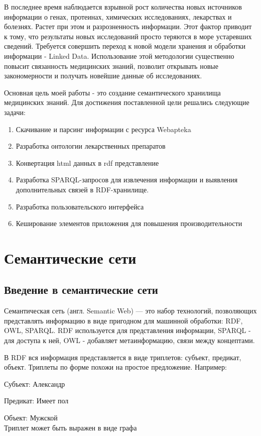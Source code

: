 \documentclass[specialist,subf,href,colorlinks=true
]{disser}
\begin{document}
\tableofcontents %
\intro
В последнее время наблюдается взрывной рост количества новых источников информации о генах, протеинах, химических исследованиях, лекарствах и болезнях. Растет при этом и разрозненность информации. Этот фактор приводит к тому, что результаты новых исследований просто теряются в море устаревших сведений.
Требуется совершить переход к новой модели хранения и обработки информации - Linked Data. Использование этой методологии существенно повысит связанность медицинских знаний, позволит открывать новые закономерности и получать новейшие данные об исследованиях.

Основная цель моей работы - это создание семантического хранилища медицинских знаний.
Для достижения поставленной цели решались следующие задачи:
\begin{enumerate}
\item Скачивание и парсинг информации с ресурса Webapteka
\item Разработка онтологии лекарственных препаратов
\item Конвертация html данных в rdf представление
\item Разработка SPARQL-запросов для извлечения информации и выявления дополнительных связей в RDF-хранилище.
\item Разработка пользовательского интерфейса
\item Кеширование элементов приложения для повышения производительности
\end{enumerate}

\chapter{Семантические сети}
\section{Введение в семантические сети}

Семантическая сеть (англ. Semantic Web) — это набор технологий, позволяющих представлять информацию в виде пригодном для машинной обработки: RDF, OWL, SPARQL. RDF используется для представления информации, SPARQL - для доступа к ней, OWL - добавляет метаинформацию, связи между концептами. \cite{linkeddata}

В RDF вся информация представляется в виде триплетов: субъект, предикат, объект. Триплеты по форме похожи на простое предложение.  Например:
\par Субъект: Александр
\par Предикат: Имеет пол
\par Объект: Мужской
\\Триплет может быть выражен в виде графа
\\
\par {}
\end{document}
